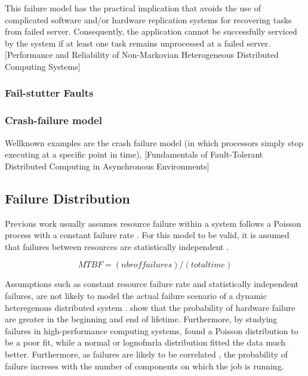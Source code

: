 \documentclass{cslthse-msc}
\begin{document}
This failure model has the practical implication that avoids the use of complicated software and/or hardware replication systems for recovering tasks from failed server. Consequently, the application cannot be successfully serviced by the system if at least one task remains unprocessed at a failed server. [Performance and Reliability of Non-Markovian Heterogeneous Distributed Computing Systems]

\subsubsection*{Fail-stutter Faults}
\cite{surveyFaultParallel}
\subsubsection*{Crash-failure model}
Wellknown examples are the crash failure model (in which processors simply stop executing at a specific point in time), [Fundamentals of Fault-Tolerant Distributed Computing in Asynchronous Environments]

\subsection{Failure Distribution}
Previous work usually assumes resource failure within a system follows a Poisson process with a constant failure rate \cite{algoMaxRelEndToEndConstraint} \cite{algoMinExTime} \cite{relModelDistSimSystem} \cite{optTaskAllocationForMaxRel} \cite{perfImplPerCheckPoint} \cite{optCheckpointInterval}. For this model to be valid, it is assumed that failures between resources are statistically independent \cite{algoMaxRelEndToEndConstraint}. 

\begin{equation} \label{eq:resource_failure}
MTBF = (nbr  of  failures) / (total time)
\end{equation}

Assumptions such as constant resource failure rate and statistically independent failures, are not likely to model the actual failure scenario of a dynamic heteregenous distributed system \cite{algoMinExTime}. 
\cite{surveyReliabilityDistr} show that the probability of hardware failure are greater in the beginning and end of lifetime. Furthermore, by studying failures in high-performance computing systems, \cite{studyOfFailures} found a Poisson distribution to be a poor fit, while a normal or lognofmrla distribution fitted the data much better. Furthermore, as failures are likely to be correlated \cite{perfImplPerCheckPoint}, the probability of failure increses with the number of components on which the job is running.
\end{document}
